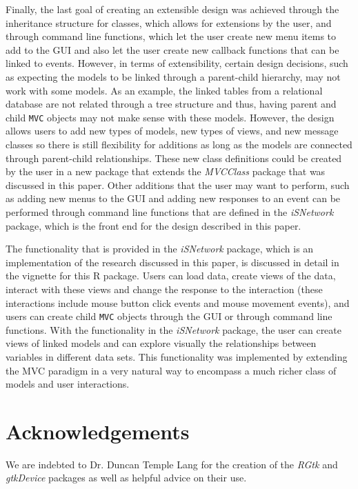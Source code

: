 \documentclass[11pt]{article}
\newcommand{\Robject}[1]{{\texttt{#1}}}
\newcommand{\Rpackage}[1]{{\textit{#1}}}
\begin{document}
Finally, the last goal of creating an extensible design was achieved through
the inheritance structure for classes, which allows for extensions by the
user, and through command line functions, which let the user create new menu
items to add to the GUI and also let the user create new callback functions
that can be linked to events.  However, in terms of extensibility, certain
design decisions, such as expecting the models to be linked through a
parent-child hierarchy, may not work with some models.  As an example, the
linked tables from a relational database are not related through a tree
structure and thus, having parent and child \Robject{MVC} objects may not make
sense with these models.  However, the design allows users to add new types
of models, new types of views, and new message classes so there is still
flexibility for additions as long as the models are connected through
parent-child relationships.  These new class definitions could be created by
the user in a new package that extends the \Rpackage{MVCClass} package that
was discussed in this paper.  Other additions that the user may want to
perform, such as adding new menus to the GUI and adding new responses to an
event can be performed through command line functions that are defined in the
\Rpackage{iSNetwork} package, which is the front end for the design
described in this paper. 

The functionality that is provided in the \Rpackage{iSNetwork} package, which
is an implementation of the research discussed in this paper, is
discussed in detail in the vignette for this R package.  Users can load data,
create views of the data, interact with these views and change the response to
the interaction (these interactions include mouse button click events and
mouse movement events), and users can create child \Robject{MVC} objects
through the GUI or through command line functions.  With the functionality in
the \Rpackage{iSNetwork} package, the user can create views of linked models
and can explore visually the relationships between variables in different data
sets.  This functionality was implemented by extending the MVC paradigm in a
very natural way to encompass a much richer class of models and user
interactions. 

\section*{Acknowledgements}
We are indebted to Dr. Duncan Temple Lang for the creation of the
\Rpackage{RGtk} and \Rpackage{gtkDevice} packages as well as helpful advice on
their use.  


\end{document}
